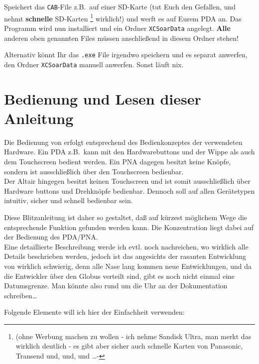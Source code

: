 Speichert das \texttt{CAB}-File z.B.\ auf einer SD-Karte (tut Euch den Gefallen, und nehmt \textbf{schnelle} SD-Karten \footnote{(ohne Werbung machen zu wollen - ich nehme Sandisk Ultra, man merkt das wirklich deutlich - es gibt aber sicher auch schnelle Karten von Panasonic, Transend  und, und, und \dots - } wirklich!) und werft es \merkes auf Eurem \textsf{PDA} an. Das Programm wird  nun installiert und ein Ordner \texttt{XCSoarData} angelegt. \textbf{Alle} anderen oben genannten Files müssen anschließend in diesem Ordner stehen!

Alternativ könnt Ihr das \texttt{.exe} File irgendwo speichern und es separat anwerfen,
den Ordner \texttt{XCSoarData} manuell anwerfen. Sonst läuft nix.
%
\section{Bedienung und Lesen dieser Anleitung}
Die Bedienung von \xc erfolgt entsprechend des Bedienkonzeptes der verwendeten Hardware.
Ein \textsf{PDA} z.B.\ kann mit den Hardwarebuttons und der Wippe als auch dem Touchscreen
bedient werden. Ein \textsf{PNA} dagegen besitzt keine Knöpfe, sondern ist ausschließlich über den Touchscreen bedienbar. \\

Der \textsf{Altair} hingegen besitzt keinen Touchscreen und ist somit ausschließlich über Hardware buttons und Drehknöpfe bedienbar. Dennoch soll \xc auf allen Gerätetypen intuitiv, sicher und schnell bedienbar sein.

Diese Blitzanleitung ist daher so gestaltet, daß auf kürzest möglichem Wege die entsprechende Funktion gefunden werden kann. Die Konzentration liegt dabei auf der Bedienung des \textsf{PDA/PNA}.\\

Eine detaillierte Beschreibung werde ich evtl. noch nachreichen, wo wirklich alle Details beschrieben werden, jedoch ist das angesichts der rasanten Entwicklung von \xc wirklich schwierig, denn alle Nase lang kommen neue Entwicklungen, und da die Entwickler über den Globus verteilt sind, gibt es noch nicht einmal eine Datumsgrenze. Man könnte also rund um die Uhr an der Dokumentation   schreiben\dots


Folgende Elemente will ich hier der Einfachheit verwenden:

